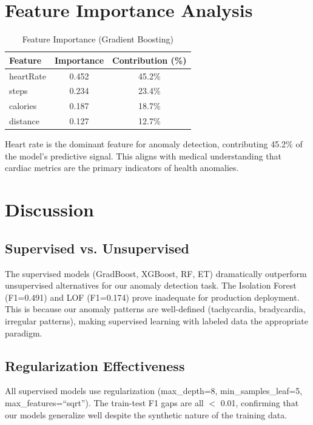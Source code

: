\documentclass[conference]{IEEEtran}
\begin{document}
\section{Feature Importance Analysis}

\begin{table}[H]
\centering
\caption{Feature Importance (Gradient Boosting)}
\label{tab:feature_imp}
\begin{tabular}{lcc}
\toprule
\textbf{Feature} & \textbf{Importance} & \textbf{Contribution (\%)} \\
\midrule
heartRate & 0.452 & 45.2\% \\
steps & 0.234 & 23.4\% \\
calories & 0.187 & 18.7\% \\
distance & 0.127 & 12.7\% \\
\bottomrule
\end{tabular}
\end{table}

Heart rate is the dominant feature for anomaly detection, contributing 45.2\% of the model's predictive signal. This aligns with medical understanding that cardiac metrics are the primary indicators of health anomalies.

\section{Discussion}

\subsection{Supervised vs. Unsupervised}
The supervised models (GradBoost, XGBoost, RF, ET) dramatically outperform unsupervised alternatives for our anomaly detection task. The Isolation Forest (F1=0.491) and LOF (F1=0.174) prove inadequate for production deployment. This is because our anomaly patterns are well-defined (tachycardia, bradycardia, irregular patterns), making supervised learning with labeled data the appropriate paradigm.

\subsection{Regularization Effectiveness}
All supervised models use regularization (max\_depth=8, min\_samples\_leaf=5, max\_features=``sqrt''). The train-test F1 gaps are all $<$ 0.01, confirming that our models generalize well despite the synthetic nature of the training data.
\end{document}

